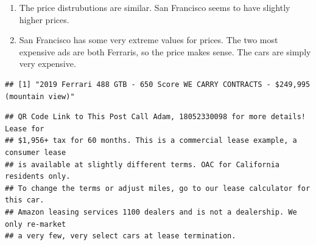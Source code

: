 \documentclass[
]{article}
\newenvironment{Shaded}{\begin{snugshade}}{\end{snugshade}}
\newcommand{\CharTok}[1]{\textcolor[rgb]{0.31,0.60,0.02}{#1}}
\newcommand{\DataTypeTok}[1]{\textcolor[rgb]{0.13,0.29,0.53}{#1}}
\newcommand{\DecValTok}[1]{\textcolor[rgb]{0.00,0.00,0.81}{#1}}
\newcommand{\KeywordTok}[1]{\textcolor[rgb]{0.13,0.29,0.53}{\textbf{#1}}}
\newcommand{\NormalTok}[1]{#1}
\newcommand{\OperatorTok}[1]{\textcolor[rgb]{0.81,0.36,0.00}{\textbf{#1}}}
\newcommand{\StringTok}[1]{\textcolor[rgb]{0.31,0.60,0.02}{#1}}
\begin{document}
\begin{enumerate}
\def\labelenumi{\arabic{enumi}.}
\setcounter{enumi}{1}
\item
  The price distrubutions are similar. San Francisco seems to have
  slightly higher prices.
\item
  San Francisco has some very extreme values for prices. The two most
  expensive ads are both Ferraris, so the price makes sense. The cars
  are simply very expensive.
\end{enumerate}

\begin{Shaded}
\end{Shaded}

\begin{verbatim}
## [1] "2019 Ferrari 488 GTB - 650 Score WE CARRY CONTRACTS - $249,995 (mountain view)"
\end{verbatim}

\begin{Shaded}
\end{Shaded}

\begin{verbatim}
## QR Code Link to This Post Call Adam, 18052330098 for more details! Lease for
## $1,956+ tax for 60 months. This is a commercial lease example, a consumer lease
## is available at slightly different terms. OAC for California residents only.
## To change the terms or adjust miles, go to our lease calculator for this car.
## Amazon leasing services 1100 dealers and is not a dealership. We only re-market
## a very few, very select cars at lease termination.
\end{verbatim}
\end{document}
